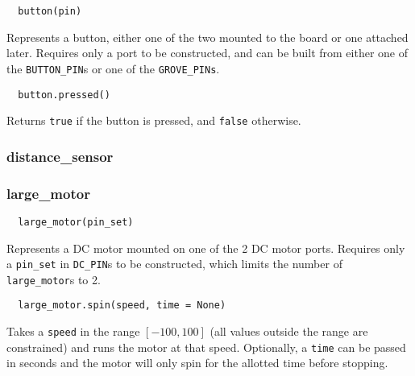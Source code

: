 \documentclass[12pt]{scrartcl} %
\begin{document}
\begin{verbatim}
  button(pin)
\end{verbatim}

Represents a button, either one of the two mounted to the board or one attached
later. Requires only a port to be constructed, and can be built from either one
of the \texttt{BUTTON_PIN}s or one of the
\texttt{GROVE_PINs}.

\begin{verbatim}
  button.pressed()
\end{verbatim}

Returns \texttt{true} if the button is pressed, and
\texttt{false} otherwise.

\subsubsection{distance\_sensor}

\subsubsection{large\_motor}

\begin{verbatim}
  large_motor(pin_set)
\end{verbatim}

Represents a DC motor mounted on one of the 2 DC motor ports. Requires only a
\texttt{pin_set} in \texttt{DC_PIN}s to be constructed,
which limits the number of \texttt{large_motor}s to 2.

\begin{verbatim}
  large_motor.spin(speed, time = None)
\end{verbatim}

Takes a \texttt{speed} in the range $[-100, 100]$ (all values
outside the range are constrained) and runs the motor at that speed.
Optionally, a \texttt{time} can be passed in seconds and the motor
will only spin for the allotted time before stopping.
\end{document}
